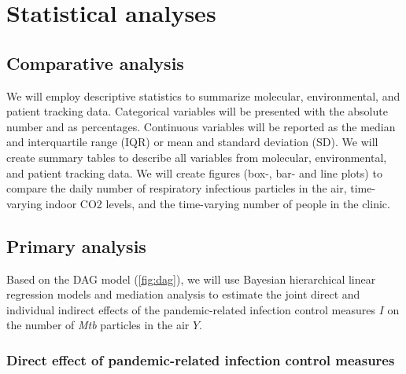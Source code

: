 \documentclass{article}
\begin{document}
\section{Statistical analyses}

\subsection{Comparative analysis}

We will employ descriptive statistics to summarize molecular, environmental, and patient tracking data. Categorical variables will be presented with the absolute number and as percentages. Continuous variables will be reported as the median and interquartile range (IQR) or mean and standard deviation (SD). We will create summary tables to describe all variables from molecular, environmental, and patient tracking data. We will create figures (box-, bar- and line plots) to compare the daily number of respiratory infectious particles in the air, time-varying indoor CO2 levels, and the time-varying number of people in the clinic.

\subsection{Primary analysis}

Based on the DAG model (\cref{fig:dag}), we will use Bayesian hierarchical linear regression models and mediation analysis to estimate the joint direct and individual indirect effects of the pandemic-related infection control measures $I$ on the number of \emph{Mtb} particles in the air $Y$. 

\subsubsection*{Direct effect of pandemic-related infection control measures}
\end{document}
